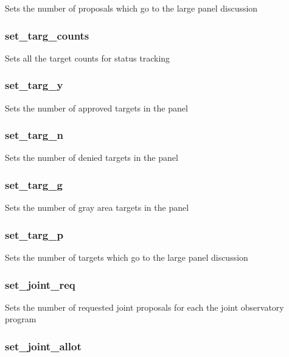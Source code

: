 \documentclass{article}
\begin{document}
Sets the number of proposals which go to the large panel discussion

\subsubsection*{set\_targ\_counts\label{Panel_set_targ_counts}}


Sets all the target counts for status tracking

\subsubsection*{set\_targ\_y\label{Panel_set_targ_y}}


Sets the number of approved targets in the panel

\subsubsection*{set\_targ\_n\label{Panel_set_targ_n}}


Sets the number of denied targets in the panel

\subsubsection*{set\_targ\_g\label{Panel_set_targ_g}}


Sets the number of gray area targets in the panel

\subsubsection*{set\_targ\_p\label{Panel_set_targ_p}}


Sets the number of targets which go to the large panel discussion

\subsubsection*{set\_joint\_req\label{Panel_set_joint_req}}


Sets the number of requested joint proposals for each the joint observatory
program

\subsubsection*{set\_joint\_allot\label{Panel_set_joint_allot}}
\end{document}
